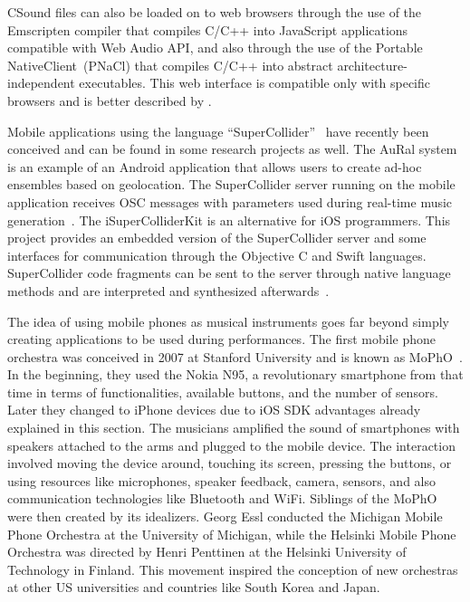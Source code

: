 CSound files can also be loaded on to web browsers through the use of the Emscripten compiler that compiles C/C++ into JavaScript applications compatible with Web Audio API, and also through the use of the Portable NativeClient~(PNaCl) that compiles C/C++ into abstract architecture-independent executables.
This web interface is compatible only with specific browsers and is better described by \cite{Lazzarini2014csound}.

Mobile applications using the language ``SuperCollider''~\citep{Mccartney2002supercollider} have recently been conceived and can be found in some research projects as well.
The AuRal system is an example of an Android application that allows users to create ad-hoc ensembles based on geolocation.
The SuperCollider server running on the mobile application receives OSC messages with parameters used during real-time music generation~\citep{Allison2012aural}.
The iSuperColliderKit is an alternative for iOS programmers.
This project provides an embedded version of the SuperCollider server and some interfaces for communication through the Objective C and Swift languages.
SuperCollider code fragments can be sent to the server through native language methods and are interpreted and synthesized afterwards~\citep{Ito2015isupercolliderkit}.

The idea of using mobile phones as musical instruments goes far beyond simply creating applications to be used during performances.
The first mobile phone orchestra was conceived in 2007
at Stanford University and is known as MoPhO~\citep{Wang2008domobilephones}.
In the beginning, they used the Nokia N95, a revolutionary smartphone from that time in terms of functionalities, available buttons, and the number of sensors.
Later they changed to iPhone devices due to iOS SDK advantages already explained in this section.
The musicians amplified the sound of smartphones with speakers attached to the arms and plugged to the mobile device.
The interaction involved moving the device around, touching its screen, pressing the buttons, or using resources like microphones, speaker feedback, camera, sensors, and also communication technologies like Bluetooth and WiFi.
Siblings of the MoPhO were then created by its idealizers.
Georg Essl conducted the Michigan Mobile Phone Orchestra at the University of Michigan, while the Helsinki Mobile Phone Orchestra was directed by Henri Penttinen at the Helsinki University of Technology in Finland.
This movement inspired the conception of new orchestras at other US universities and countries like South Korea and Japan.

